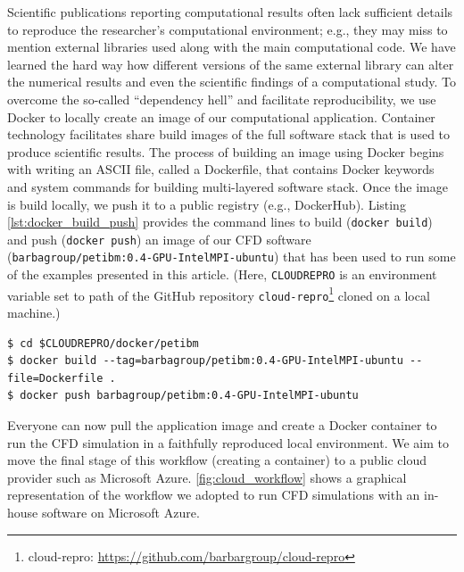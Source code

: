 \documentclass[10pt,journal,compsoc]{IEEEtran}
\begin{document}
Scientific publications reporting computational results often lack sufficient details to reproduce the researcher's computational environment; e.g., they may miss to mention external libraries used along with the main computational code.
We have learned the hard way how different versions of the same external library can alter the numerical results and even the scientific findings of a computational study\cite{mesnard_barba_2017}.
To overcome the so-called ``dependency hell'' and facilitate reproducibility, we use Docker to locally create an image of our computational application.
Container technology facilitates share build images of the full software stack that is used to produce scientific results.
The process of building an image using Docker begins with writing an ASCII file, called a Dockerfile, that contains Docker keywords and system commands for building multi-layered software stack.
Once the image is build locally, we push it to a public registry (e.g., DockerHub).
Listing \ref{lst:docker_build_push} provides the command lines to build (\texttt{docker build}) and push (\texttt{docker push}) an image of our CFD software (\texttt{barbagroup/petibm:0.4-GPU-IntelMPI-ubuntu}) that has been used to run some of the examples presented in this article.
(Here, \texttt{CLOUDREPRO} is an environment variable set to path of the GitHub repository \texttt{cloud-repro}\footnote{cloud-repro: \url{https://github.com/barbargroup/cloud-repro}} cloned on a local machine.)

\begin{lstlisting}[label=lst:docker_build_push,caption={Build and push a Docker image.}]
$ cd $CLOUDREPRO/docker/petibm
$ docker build --tag=barbagroup/petibm:0.4-GPU-IntelMPI-ubuntu --file=Dockerfile .
$ docker push barbagroup/petibm:0.4-GPU-IntelMPI-ubuntu
\end{lstlisting}

Everyone can now pull the application image and create a Docker container to run the CFD simulation in a faithfully reproduced local environment.
We aim to move the final stage of this workflow (creating a container) to a public cloud provider such as Microsoft Azure.
\ref{fig:cloud_workflow} shows a graphical representation of the workflow we adopted to run CFD simulations with an in-house software on Microsoft Azure.
\end{document}
